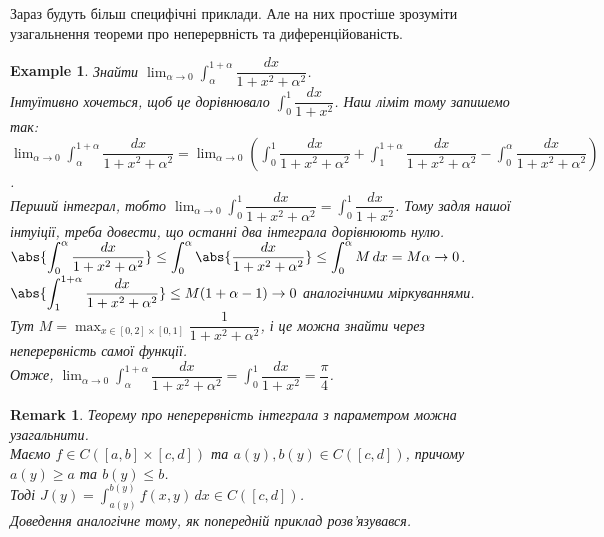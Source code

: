 \documentclass[a4paper, 10pt]{article}
\def\huge{\displaystyle}
\theoremstyle{theoremdd}
\theoremstyle{theoremdd}
\theoremstyle{theoremdd}
\theoremstyle{theoremdd}
\theoremstyle{theoremdd}
\newtheorem{example}[theorem]{Example}
\theoremstyle{theoremdd}
\theoremstyle{theoremdd}
\newtheorem{remark}[theorem]{Remark}
\theoremstyle{theoremdd}
\theoremstyle{theoremdd}
\begin{document}
Зараз будуть більш специфічні приклади. Але на них простіше зрозуміти узагальнення теореми про неперервність та диференційованість.
\begin{example}
Знайти $\huge\lim_{\alpha \to 0} \int_{\alpha}^{1+\alpha} \dfrac{dx}{1+x^2+\alpha^2}$.\\
Інтуїтивно хочеться, щоб це дорівнювало $\huge\int_0^1 \dfrac{dx}{1+x^2}$. Наш ліміт тому запишемо так:\\
$\huge\lim_{\alpha \to 0} \int_{\alpha}^{1+\alpha} \dfrac{dx}{1+x^2+\alpha^2} = \lim_{\alpha \to 0} \left( \int_0^1 \dfrac{dx}{1+x^2+\alpha^2} + \int_1^{1+\alpha} \dfrac{dx}{1+x^2+\alpha^2} - \int_0^{\alpha} \dfrac{dx}{1+x^2+\alpha^2} \right)$.\\
Перший інтеграл, тобто $\huge \lim_{\alpha \to 0} \int_0^1 \dfrac{dx}{1+x^2+\alpha^2} = \int_0^1 \dfrac{dx}{1+x^2}$. Тому задля нашої інтуіції, треба довести, що останні два інтеграла дорівнюють нулю.\\
$\huge \abs{\int_0^\alpha \dfrac{dx}{1+x^2+\alpha^2}} \leq \int_0^\alpha \abs{\dfrac{dx}{1+x^2+\alpha^2}} \leq \int_0^\alpha M\,dx = M \alpha \to 0$.\\
$\huge \abs{\int_1^{1+\alpha} \dfrac{dx}{1+x^2+\alpha^2}} \leq M (1+\alpha-1) \to 0$ аналогічними міркуваннями.\\
Тут $M = \huge\max_{x \in [0,2] \times [0,1]} \dfrac{1}{1+x^2+\alpha^2}$, і це можна знайти через неперервність самої функції.\\
Отже, $\huge\lim_{\alpha \to 0} \int_\alpha^{1+\alpha} \dfrac{dx}{1+x^2+\alpha^2} = \int_0^1 \dfrac{dx}{1+x^2} = \dfrac{\pi}{4}$.
\end{example}

\begin{remark}
Теорему про неперервність інтеграла з параметром можна узагальнити.\\
Маємо $f \in C([a,b] \times [c,d])$ та $a(y),b(y) \in C([c,d])$, причому $a(y) \geq a$ та $b(y) \leq b$.\\
Тоді $J(y) = \huge\int_{a(y)}^{b(y)} f(x,y)\,dx \in C([c,d])$.\\
Доведення аналогічне тому, як попередній приклад розв'язувався.
\end{remark}
\end{document}
